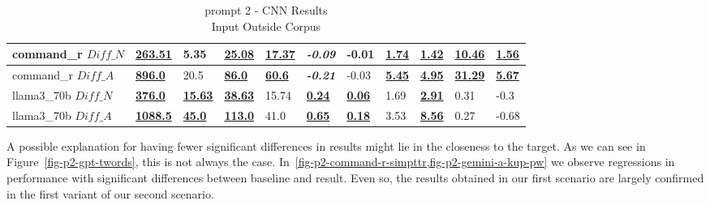 \documentclass[11pt]{article}
\begin{document}
\begin{table}[hpb]
{\begin{tabular}{lllllllllll}
            command\_r $Diff\_N$  & \textbf{\underline{263.51}}  & 5.35                       & \textbf{\underline{25.08}}  & \textbf{\underline{17.37}} & \textbf{\textit{-0.09}}   & -0.01                     & \textbf{\underline{1.74}} & \textbf{\underline{1.42}} & \textbf{\underline{10.46}} & \textbf{\underline{1.56}} \\ \midrule
            command\_r $Diff\_A$  & \textbf{\underline{896.0}}   & 20.5                       & \textbf{\underline{86.0}}   & \textbf{\underline{60.6}}  & \textbf{\textit{-0.21}}   & -0.03                     & \textbf{\underline{5.45}} & \textbf{\underline{4.95}} & \textbf{\underline{31.29}} & \textbf{\underline{5.67}} \\ \midrule
            llama3\_70b $Diff\_N$ & \textbf{\underline{376.0}}   & \textbf{\underline{15.63}} & \textbf{\underline{38.63}}  & 15.74                      & \textbf{\underline{0.24}} & \textbf{\underline{0.06}} & 1.69                      & \textbf{\underline{2.91}} & 0.31                       & -0.3                      \\ \midrule
            llama3\_70b $Diff\_A$ & \textbf{\underline{1088.5}}  & \textbf{\underline{45.0}}  & \textbf{\underline{113.0}}  & 41.0                       & \textbf{\underline{0.65}} & \textbf{\underline{0.18}} & 3.53                      & \textbf{\underline{8.56}} & 0.27                       & -0.68                     \\ \bottomrule
        \end{tabular}%
    }
    \caption{prompt 2 - CNN Results\\Input Outside Corpus}
    \label{table-prompt-2-cnn-dailymail}
\end{table}

A possible explanation for having fewer significant differences in results might
lie in the closeness to the target.
As we can see in Figure~\ref{fig-p2-gpt-twords}, this is not always the case.
In~\cref{fig-p2-command-r-simpttr,fig-p2-gemini-a-kup-pw} we observe regressions
in performance with significant differences between baseline and result.
Even so, the results obtained in our first scenario are largely confirmed in the
first variant of our second scenario.
\end{document}
